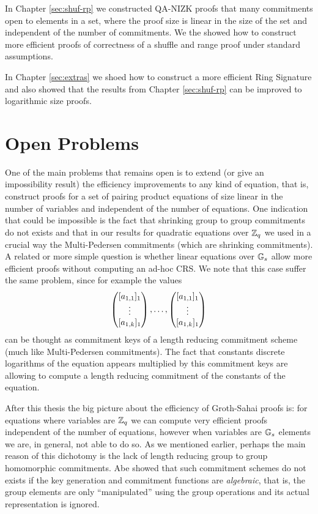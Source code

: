 In Chapter \ref{sec:shuf-rp} we constructed QA-NIZK proofs that many commitments open to elements in a set, where the proof size is linear in the size of the set and independent of the number of commitments. We the showed how to construct more efficient proofs of correctness of a shuffle and range proof under standard assumptions.

In Chapter \ref{sec:extras} we shoed how to construct a more efficient Ring Signature and also showed that the results from Chapter \ref{sec:shuf-rp} can be improved to logarithmic size proofs.

\section{Open Problems}
One of the main problems that remains open is to extend (or give an impossibility result) the efficiency improvements to any kind of equation, that is, construct proofs for a set of pairing product equations of size linear in the number of variables and independent of the number of equations. One indication that could be impossible is the fact that shrinking group to group commitments do not exists \cite{EC:AbeHarOhk12} and that in our results for quadratic equations over $\mathbb{Z}_q$ we used in a crucial way the Multi-Pedersen commitments (which are shrinking commitments). A related or more simple question is whether linear equations over $\mathbb{G}_s$ allow more efficient proofs without computing an ad-hoc CRS. We note that this case suffer the same problem, since for example the values 
$$\left(\begin{matrix}{[a_{1,1}]_1}\\\vdots\\{[a_{1,k}]_1}\end{matrix}\right),\ldots,\left(\begin{matrix}{[a_{1,1}]_1}\\\vdots\\{[a_{1,k}]_1}\end{matrix}\right)$$
can be thought as commitment keys of a length reducing commitment scheme (much like Multi-Pedersen commitments). The fact that constants discrete logarithms of the equation appears multiplied by this commitment keys are allowing to compute a length reducing commitment of the constants of the equation.

After this thesis the big picture about the efficiency of Groth-Sahai proofs is: for equations where variables are $\mathbb{Z}_q$ we can compute very efficient proofs independent of the number of equations, however when variables are $\mathbb{G}_s$ elements we are, in general, not able to do so. As we mentioned earlier, perhaps the main reason of this dichotomy is the lack of length reducing group to group homomorphic commitments. Abe showed that such commitment schemes do not exists if the key generation and commitment functions are \emph{algebraic}, that is, the group elements are only ``manipulated'' using the group operations and its actual representation is ignored.

